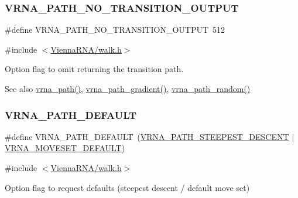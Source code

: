 \subsubsection{\texorpdfstring{V\+R\+N\+A\+\_\+\+P\+A\+T\+H\+\_\+\+N\+O\+\_\+\+T\+R\+A\+N\+S\+I\+T\+I\+O\+N\+\_\+\+O\+U\+T\+P\+UT}{VRNA\_PATH\_NO\_TRANSITION\_OUTPUT}}
{\footnotesize\ttfamily \#define V\+R\+N\+A\+\_\+\+P\+A\+T\+H\+\_\+\+N\+O\+\_\+\+T\+R\+A\+N\+S\+I\+T\+I\+O\+N\+\_\+\+O\+U\+T\+P\+UT~512}



{\ttfamily \#include $<$\hyperlink{walk_8h}{Vienna\+R\+N\+A/walk.\+h}$>$}



Option flag to omit returning the transition path. 

\begin{DoxySeeAlso}{See also}
\hyperlink{group__paths_gab6aee4143f8b103518d5cbfe6bfe5eae}{vrna\+\_\+path()}, \hyperlink{group__paths_gae92cce443a8a64f7b7fb89867b7d6125}{vrna\+\_\+path\+\_\+gradient()}, \hyperlink{group__paths_ga9234756c337078fa599529d3db70d913}{vrna\+\_\+path\+\_\+random()} 
\end{DoxySeeAlso}
\mbox{\label{group__paths_gaf1bb1f8fec8d24e3b821f621b19f77b4}} 
\subsubsection{\texorpdfstring{V\+R\+N\+A\+\_\+\+P\+A\+T\+H\+\_\+\+D\+E\+F\+A\+U\+LT}{VRNA\_PATH\_DEFAULT}}
{\footnotesize\ttfamily \#define V\+R\+N\+A\+\_\+\+P\+A\+T\+H\+\_\+\+D\+E\+F\+A\+U\+LT~(\hyperlink{group__paths_ga705cea2b3243a38a2d6e3b1e141ed061}{V\+R\+N\+A\+\_\+\+P\+A\+T\+H\+\_\+\+S\+T\+E\+E\+P\+E\+S\+T\+\_\+\+D\+E\+S\+C\+E\+NT} $\vert$ \hyperlink{group__neighbors_gaa5ffec4dd0d02df320f123e6888154d1}{V\+R\+N\+A\+\_\+\+M\+O\+V\+E\+S\+E\+T\+\_\+\+D\+E\+F\+A\+U\+LT})}



{\ttfamily \#include $<$\hyperlink{walk_8h}{Vienna\+R\+N\+A/walk.\+h}$>$}



Option flag to request defaults (steepest descent / default move set) 

